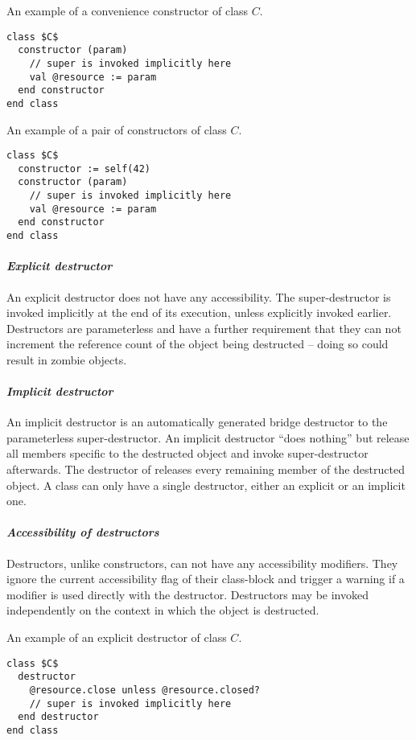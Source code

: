 \example An example of a convenience constructor of class $C$.
\begin{lstlisting}
class $C$
  constructor (param)
    // super is invoked implicitly here
    val @resource := param
  end constructor
end class
\end{lstlisting}

\example An example of a pair of constructors of class $C$. 
\begin{lstlisting}
class $C$
  constructor := self(42)
  constructor (param)
    // super is invoked implicitly here
    val @resource := param
  end constructor
end class
\end{lstlisting}

\paragraph{\em Explicit destructor}
An explicit destructor does not have any accessibility. The super-destructor is invoked implicitly at the end of its execution, unless explicitly invoked earlier. Destructors are parameterless and have a further requirement that they can not increment the reference count of the object being destructed -- doing so could result in zombie objects. 

\paragraph{\em Implicit destructor}
An implicit destructor is an automatically generated bridge destructor to the parameterless super-destructor. An implicit destructor ``does nothing'' but release all members specific to the destructed object and invoke super-destructor afterwards. The destructor of  releases every remaining member of the destructed object. A class can only have a single destructor, either an explicit or an implicit one. 

\paragraph{\em Accessibility of destructors}
Destructors, unlike constructors, can not have any accessibility modifiers. They ignore the current accessibility flag of their class-block and trigger a warning if a modifier is used directly with the destructor. Destructors may be invoked independently on the context in which the object is destructed. 

\example An example of an explicit destructor of class $C$. 
\begin{lstlisting}
class $C$
  destructor
    @resource.close unless @resource.closed?
    // super is invoked implicitly here
  end destructor
end class
\end{lstlisting}


